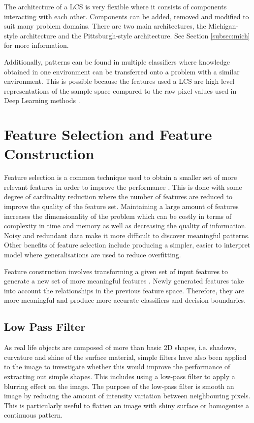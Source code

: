 The architecture of a LCS is very flexible where it consists of components interacting with each other.  Components can be added, removed and modified to suit many problem domains. There are two main architectures, the Michigan-style architecture and the Pittsburgh-style architecture. See Section \ref{subsec:mich} for more information. 

Additionally, patterns can be found in multiple classifiers where knowledge obtained in one environment can be transferred onto a problem with a similar environment. This is possible because the features used a LCS are high level representations of the sample space compared to the raw pixel values used in Deep Learning methods \cite{zang2015learning}.

\section{Feature Selection and Feature Construction}\label{subsubsec:fsfc}

Feature selection is a common technique used to obtain a smaller set of more relevant features in order to improve the performance \cite{yu2004efficient}. This is done with some degree of cardinality reduction where the number of features are reduced to improve the quality of the feature set. Maintaining a large amount of features increases the dimensionality of the problem which can be costly in terms of complexity in time and memory as well as decreasing the quality of information. Noisy and redundant data make it more difficult to discover meaningful patterns. Other benefits of feature selection include producing a simpler, easier to interpret model where generalisations are used to reduce overfitting.

Feature construction involves transforming a given set of input features to generate a new set of more meaningful features \cite{markovitch2002feature}. Newly generated features take into account the relationships in the previous feature space. Therefore, they are more meaningful and produce more accurate classifiers and decision boundaries. 

\subsection{Low Pass Filter}
As real life objects are composed of more than basic 2D shapes, i.e. shadows, curvature and shine of the surface material, simple filters have also been applied to the image to investigate whether this would improve the performance of extracting out simple shapes. This includes using a low-pass filter to apply a blurring effect on the image. The purpose of the low-pass filter is smooth an image by reducing the amount of intensity variation between neighbouring pixels. This is particularly useful to flatten an image with shiny surface or homogenise a continuous pattern.

